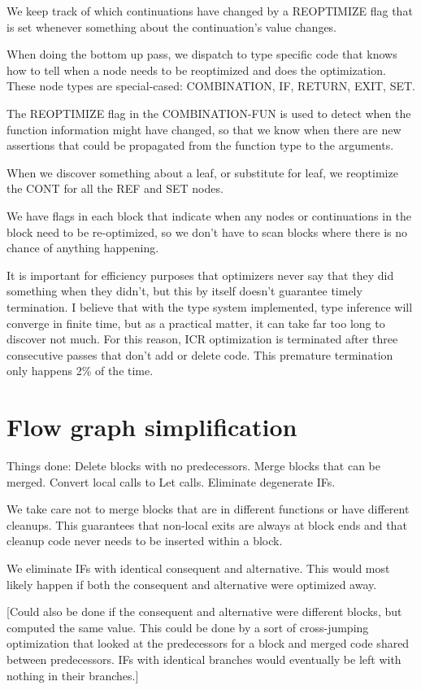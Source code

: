 We keep track of which continuations have changed by a REOPTIMIZE flag that is
set whenever something about the continuation's value changes.

When doing the bottom up pass, we dispatch to type specific code that knows how
to tell when a node needs to be reoptimized and does the optimization.  These
node types are special-cased: COMBINATION, IF, RETURN, EXIT, SET.

The REOPTIMIZE flag in the COMBINATION-FUN is used to detect when the function
information might have changed, so that we know when there are new assertions
that could be propagated from the function type to the arguments.

When we discover something about a leaf, or substitute for leaf, we reoptimize
the CONT for all the REF and SET nodes. 

We have flags in each block that indicate when any nodes or continuations in
the block need to be re-optimized, so we don't have to scan blocks where there
is no chance of anything happening.

It is important for efficiency purposes that optimizers never say that they did
something when they didn't, but this by itself doesn't guarantee timely
termination.  I believe that with the type system implemented, type inference
will converge in finite time, but as a practical matter, it can take far too
long to discover not much.  For this reason, ICR optimization is terminated
after three consecutive passes that don't add or delete code.  This premature
termination only happens 2\% of the time.


\section{Flow graph simplification}

Things done:
    Delete blocks with no predecessors.
    Merge blocks that can be merged.
    Convert local calls to Let calls.
    Eliminate degenerate IFs.

We take care not to merge blocks that are in different functions or have
different cleanups.  This guarantees that non-local exits are always at block
ends and that cleanup code never needs to be inserted within a block.

We eliminate IFs with identical consequent and alternative.  This would most
likely happen if both the consequent and alternative were optimized away.

[Could also be done if the consequent and alternative were different blocks,
but computed the same value.  This could be done by a sort of cross-jumping
optimization that looked at the predecessors for a block and merged code shared
between predecessors.  IFs with identical branches would eventually be left
with nothing in their branches.]

